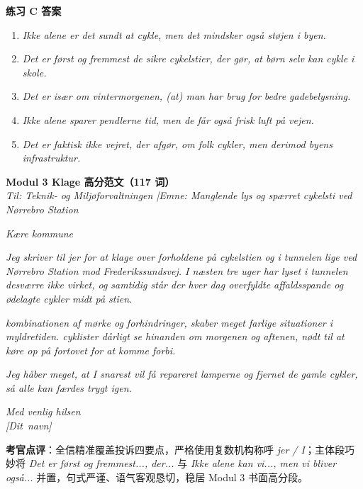 \begin{answerbox}
\textbf{练习 C 答案}
\begin{enumerate}
  \item \textit{Ikke alene er det sundt at cykle, men det mindsker også støjen i byen.}
  \item \textit{Det er først og fremmest de sikre cykelstier, der gør, at børn selv kan cykle i skole.}
  \item \textit{Det er især om vintermorgenen, (at) man har brug for bedre gadebelysning.}
  \item \textit{Ikke alene sparer pendlerne tid, men de får også frisk luft på vejen.}
  \item \textit{Det er faktisk ikke vejret, der afgør, om folk cykler, men derimod byens infrastruktur.}
\end{enumerate}

\textbf{Modul 3 Klage 高分范文（117 词）}\\
\textit{Til: Teknik- og Miljøforvaltningen \quad|\quad Emne: Manglende lys og spærret cykelsti ved Nørrebro Station}

\textit{Kære kommune}

\textit{Jeg skriver til jer for at klage over forholdene på cykelstien og i tunnelen lige ved Nørrebro Station mod Frederikssundsvej. I næsten tre uger har lyset i tunnelen desværre ikke virket, og samtidig står der hver dag overfyldte affaldsspande og ødelagte cykler midt på stien.}

\textit{ kombinationen af mørke og forhindringer,  skaber meget farlige situationer i myldretiden.  cyklister dårligt se hinanden om morgenen og aftenen,  nødt til at køre op på fortovet for at komme forbi.}

\textit{Jeg håber meget, at I snarest vil få repareret lamperne og fjernet de gamle cykler, så alle kan færdes trygt igen.}

\textit{Med venlig hilsen\\
\mbox{[Dit navn]}}

\small\textbf{考官点评}：全信精准覆盖投诉四要点，严格使用复数机构称呼 \textit{jer / I}；主体段巧妙将 \textit{Det er først og fremmest..., der...} 与 \textit{Ikke alene kan vi..., men vi bliver også...} 并置，句式严谨、语气客观恳切，稳居 Modul 3 书面高分段。
\end{answerbox}
